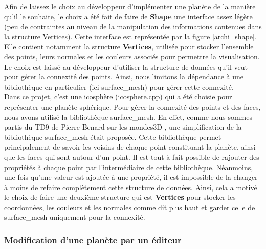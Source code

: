 \documentclass[a4paper]{article}
\begin{document}
Afin de laissez le choix au développeur d'implémenter une planète de la manière qu'il le souhaite, le choix a été fait de faire de \textbf{Shape} une interface assez légère (peu de contraintes au niveau de la manipulation des informations contenues dans la structure Vertices). Cette interface est représentée par la figure \ref{archi_shape}. Elle contient notamment la structure \textbf{Vertices}, utilisée pour stocker l'ensemble des points, leurs normales et les couleurs associés pour permettre la visualisation. Le choix est laissé au développeur d'utiliser la structure de données qu'il veut pour gérer la connexité des points. Ainsi, nous limitons la dépendance à une bibliothèque en particulier (ici surface\_mesh) pour gérer cette connexité. \\
Dans ce projet, c'est une icosphère (icosphere.cpp) qui a été choisie pour représenter une planète sphérique. Pour gérer la connexité des points et des faces, nous avons utilisé la bibliothèque surface\_mesh. En effet, comme nous sommes partis du TD9 de Pierre Benard sur les mondes3D \cite{TD_3D}, une simplification de la bibliothèque surface\_mesh était proposée. Cette bibliothèque permet principalement de savoir les voisins de chaque point constituant la planète, ainsi que les faces qui sont autour d'un point. Il est tout à fait possible de rajouter des propriétés à chaque point par l'intermédiaire de cette bibliothèque. Néanmoins, une fois qu'une valeur est ajoutée à une propriété, il est impossible de la changer à moins de refaire complètement cette structure de données. Ainsi, cela a motivé le choix de faire une deuxième structure qui est \textbf{Vertices} pour stocker les coordonnées, les couleurs et les normales comme dit plus haut et garder celle de surface\_mesh uniquement pour la connexité.

\subsubsection{Modification d'une planète par un éditeur}
\end{document}
